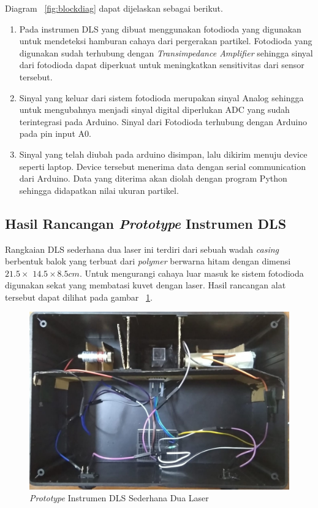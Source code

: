 Diagram ~\ref{fig:blockdiag} dapat dijelaskan sebagai berikut.

\begin{enumerate}
    \item Pada instrumen DLS yang dibuat menggunakan fotodioda yang digunakan untuk mendeteksi
    hamburan cahaya dari pergerakan partikel. Fotodioda yang digunakan sudah terhubung dengan
    \textit{Transimpedance Amplifier} sehingga sinyal dari fotodioda dapat diperkuat untuk
    meningkatkan sensitivitas dari sensor tersebut.

    \item Sinyal yang keluar dari sistem fotodioda merupakan sinyal Analog sehingga untuk
    mengubahnya menjadi sinyal digital diperlukan ADC yang sudah terintegrasi pada Arduino.
    Sinyal dari Fotodioda terhubung dengan Arduino pada pin input A0.

    \item Sinyal yang telah diubah pada arduino disimpan, lalu dikirim menuju device seperti
    laptop. Device tersebut menerima data dengan serial communication
    dari Arduino. Data yang diterima akan diolah dengan program Python sehingga
    didapatkan nilai ukuran partikel.
\end{enumerate}


\subsection{Hasil Rancangan \textit{Prototype} Instrumen DLS}
Rangkaian DLS sederhana dua laser ini terdiri dari sebuah wadah \textit{casing} berbentuk balok
yang terbuat dari \textit{polymer} berwarna hitam dengan dimensi ${21.5 \times }$
${14.5 \times 8.5cm}$. Untuk mengurangi cahaya luar masuk ke sistem fotodioda digunakan sekat
yang membatasi kuvet dengan laser. Hasil rancangan alat tersebut dapat dilihat pada gambar
~\ref{fig:prot}.
\begin{figure}[H]
    \centering
    \includegraphics[width=12cm]{Images/Rangkaian.jpg}
    \caption{\textit{Prototype} Instrumen DLS Sederhana Dua Laser}
    \label{fig:prot}
\end{figure}



